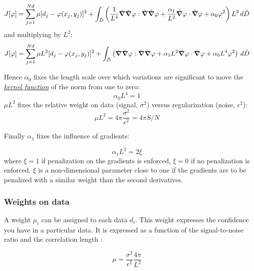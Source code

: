 \begin{equation}
J[\varphi]=\sum_{j=1}^{Nd}\mu[d_{j}-\varphi(x_{j},y_{j})]^{2}+
 \int_{\tilde{D}}\left(
\frac{1}{L^4} \tilde{\boldsymbol{\nabla}}\tilde{\boldsymbol{\nabla}}\varphi : \tilde{\boldsymbol{\nabla}}\tilde{\boldsymbol{\nabla}}\varphi + \frac{\alpha_{1}}{L^2}
\tilde{\boldsymbol{\nabla}}\varphi \cdot \tilde{\boldsymbol{\nabla}}\varphi + \alpha_{0} \varphi^{2} \right) L^2\,d\tilde{D}
\end{equation}
and multiplying by $L^{2}$:
\begin{equation}
{J}[\varphi]=\sum_{j=1}^{Nd}\mu L^2 [d_{j}-\varphi(x_{j},y_{j})]^{2}+
 \int_{\tilde{D}}\left(
 \tilde{\boldsymbol{\nabla}}\tilde{\boldsymbol{\nabla}}\varphi : \tilde{\boldsymbol{\nabla}}\tilde{\boldsymbol{\nabla}}\varphi + { \alpha_{1} L^2}
\tilde{\boldsymbol{\nabla}}\varphi \cdot \tilde{\boldsymbol{\nabla}}\varphi + \alpha_{0} L^4 \varphi^{2} \right) \,d\tilde{D}
\label{divaformulaadim}
\end{equation}


Hence $\alpha_0$ fixes the length scale over which variations are significant to move the \hyperlink{KERNEL}{\textit{kernel function}} of the norm from one to zero:
\begin{equation}
\alpha_0 L^4 = 1
\end{equation}
$ \mu L^2$ fixes the relative weight on data (signal, $\sigma^2$) versus regularization (noise, $\epsilon^2$):
\begin{equation}
\mu L^2= 4 \pi \frac{\sigma^2}{\epsilon^2}= 4 \pi S/N 
\label{defmu}
\end{equation}

Finally  $\alpha_1$ fixes the influence of gradients:

\begin{equation}
\alpha_1 L^2 = 2 \xi
\end{equation}
where   $\xi=1$ if penalization on the gradients is enforced, $\xi=0$ if no penalization is enforced. $\xi$ is a non-dimensional parameter close to one if the gradients are to be penalized with a similar weight than the second derivatives.


\subsubsection{Weights on data}

A weight $\mu_i$ can be assigned to each data $d_i$. This weight expresses the confidence you have in a particular data. It is expressed as a function of the signal-to-noise ratio and the correlation length \cite{BRANKART96}: 

\begin{equation}
\mu=\frac{\sigma^{2}}{\epsilon^{2}} \frac{4 \pi}{L^{2}}
\end{equation}


